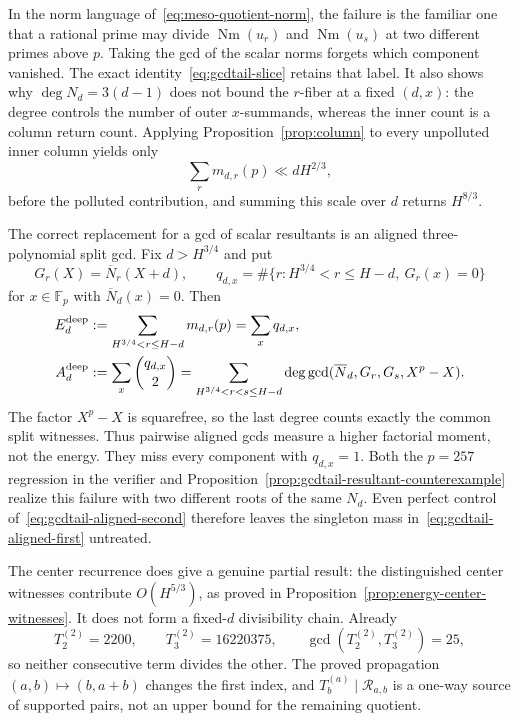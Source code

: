 In the norm language of~\eqref{eq:meso-quotient-norm}, the failure is the
familiar one that a rational prime may divide $\operatorname {Nm}(u_r)$
and $\operatorname {Nm}(u_s)$ at two different primes above $p$.  Taking
the gcd of the scalar norms forgets which component vanished.  The exact
identity~\eqref{eq:gcdtail-slice} retains that label.  It also shows why
$\deg N_d=3(d-1)$ does not bound the $r$-fiber at a fixed $(d,x)$: the
degree controls the number of outer $x$-summands, whereas the inner count
is a column return count.  Applying Proposition~\ref{prop:column} to every
unpolluted inner column yields only
\[
 \sum_r m_{d,r}(p)\ll dH^{2/3},
\]
before the polluted contribution, and summing this scale over $d$ returns
$H^{8/3}$.

The correct replacement for a gcd of scalar resultants is an aligned
three-polynomial split gcd.  Fix $d>H^{3/4}$ and put
\[
 G_r(X)=\overline N_r(X+d),\qquad
 q_{d,x}=\#\{r:H^{3/4}<r\leq H-d,\ G_r(x)=0\}
\]
for $x\in\mathbb F_p$ with $\overline N_d(x)=0$.  Then
\begin{align}
 E_d^{\rm deep}
 &:=\sum_{H^{3/4}<r\leq H-d}m_{d,r}(p)
   =\sum_xq_{d,x},\label{eq:gcdtail-aligned-first}\\
 A_d^{\rm deep}
 &:=\sum_x\binom{q_{d,x}}2
   =\sum_{H^{3/4}<r<s\leq H-d}
       \deg\gcd(\overline N_d,G_r,G_s,X^p-X).
 \label{eq:gcdtail-aligned-second}
\end{align}
The factor $X^p-X$ is squarefree, so the last degree counts exactly the
common split witnesses.  Thus pairwise aligned gcds measure a higher
factorial moment, not the energy.  They miss every component with
$q_{d,x}=1$.  Both the $p=257$ regression in the verifier and
Proposition~\ref{prop:gcdtail-resultant-counterexample} realize this
failure with two different roots of the same $N_d$.  Even perfect control
of~\eqref{eq:gcdtail-aligned-second} therefore leaves the singleton mass
in~\eqref{eq:gcdtail-aligned-first} untreated.

The center recurrence does give a genuine partial result: the
distinguished center witnesses contribute $O(H^{5/3})$, as proved in
Proposition~\ref{prop:energy-center-witnesses}.  It does not form a
fixed-$d$ divisibility chain.  Already
\[
 T_2^{(2)}=2200,\qquad T_3^{(2)}=16220375,\qquad
 \gcd(T_2^{(2)},T_3^{(2)})=25,
\]
so neither consecutive term divides the other.  The proved propagation
$(a,b)\mapsto(b,a+b)$ changes the first index, and
$T_b^{(a)}\mid\mathcal R_{a,b}$ is a one-way source of supported pairs,
not an upper bound for the remaining quotient.

